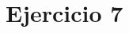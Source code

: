 \documentclass[../../e3_tp2_main.tex]{subfiles}
\begin{document}
\chapter{Ejercicio 7}
\end{document}
